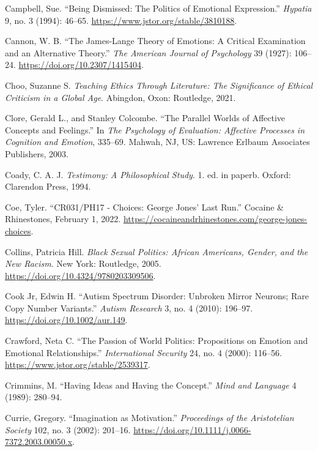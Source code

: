 \documentclass[
  12pt,
]{book}
\newlength{\cslhangindent}
\newenvironment{CSLReferences}[2] %
 {\begin{list}{}{%
  \setlength{\itemindent}{0pt}
  \setlength{\leftmargin}{0pt}
  \setlength{\parsep}{0pt}
  \ifodd #1
   \setlength{\leftmargin}{\cslhangindent}
   \setlength{\itemindent}{-1\cslhangindent}
  \fi
  \setlength{\itemsep}{#2\baselineskip}}}
 {\end{list}}
\theoremstyle{definition}
\theoremstyle{definition}
\theoremstyle{definition}
\theoremstyle{definition}
\theoremstyle{remark}
\begin{document}
\begin{CSLReferences}{1}{0}
Campbell, Sue. {``Being {Dismissed}: {The Politics} of {Emotional Expression}.''} \emph{Hypatia} 9, no. 3 (1994): 46--65. \url{https://www.jstor.org/stable/3810188}.

Cannon, W. B. {``The {James-Lange} Theory of Emotions: A Critical Examination and an Alternative Theory.''} \emph{The American Journal of Psychology} 39 (1927): 106--24. \url{https://doi.org/10.2307/1415404}.

Choo, Suzanne S. \emph{Teaching Ethics Through Literature: The Significance of Ethical Criticism in a Global Age}. Abingdon, Oxon: Routledge, 2021.

Clore, Gerald L., and Stanley Colcombe. {``The Parallel Worlds of Affective Concepts and Feelings.''} In \emph{The Psychology of Evaluation: {Affective} Processes in Cognition and Emotion}, 335--69. Mahwah, NJ, US: Lawrence Erlbaum Associates Publishers, 2003.

Coady, C. A. J. \emph{Testimony: A Philosophical Study}. 1. ed. in paperb. Oxford: Clarendon Press, 1994.

Coe, Tyler. {``{CR031}/{PH17} - {Choices}: {George Jones}' {Last Run}.''} Cocaine \& Rhinestones, February 1, 2022. \url{https://cocaineandrhinestones.com/george-jones-choices}.

Collins, Patricia Hill. \emph{Black {Sexual Politics}: {African Americans}, {Gender}, and the {New Racism}}. New York: Routledge, 2005. \url{https://doi.org/10.4324/9780203309506}.

Cook Jr, Edwin H. {``Autism Spectrum Disorder: Unbroken Mirror Neurons; Rare Copy Number Variants.''} \emph{Autism Research} 3, no. 4 (2010): 196--97. \url{https://doi.org/10.1002/aur.149}.

Crawford, Neta C. {``The Passion of World Politics: Propositions on Emotion and Emotional Relationships.''} \emph{International Security} 24, no. 4 (2000): 116--56. \url{https://www.jstor.org/stable/2539317}.

Crimmins, M. {``Having Ideas and Having the Concept.''} \emph{Mind and Language} 4 (1989): 280--94.

Currie, Gregory. {``Imagination as Motivation.''} \emph{Proceedings of the Aristotelian Society} 102, no. 3 (2002): 201--16. \url{https://doi.org/10.1111/j.0066-7372.2003.00050.x}.


\end{CSLReferences}
\end{document}
